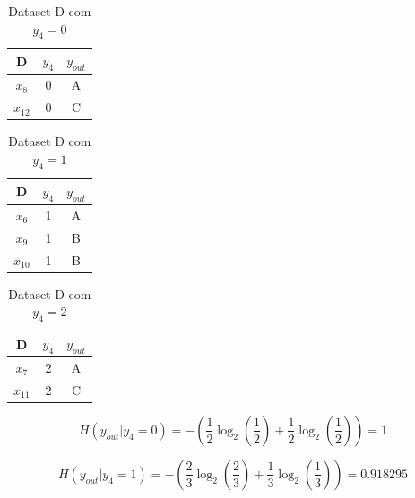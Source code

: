 \documentclass{article}
\begin{document}
\begin{multicols}{3}
\setlength{\columnseprule}{0pt}

\vspace*{\fill}
\begin{table}[H]
\centering
\begin{tabular}{|c|c|c|}
\hline  
D     & $y_4$ & $y_{out}$ \\ \hline
$x_8$ & 0     & A         \\ \hline
$x_{12}$ & 0     & C         \\ \hline
\end{tabular}
\caption{Dataset D com $y_4 = 0$}
\label{tab:datasetDy4=0}
\end{table}

\vspace*{\fill}
\collumnbreak

\begin{table}[H]
\centering
\begin{tabular}{|c|c|c|}
\hline
D     & $y_4$ & $y_{out}$ \\ \hline
$x_6$ & 1     & A         \\ \hline
$x_9$ & 1     & B         \\ \hline
$x_{10}$ & 1     & B         \\ \hline
\end{tabular}
\caption{Dataset D com $y_4 = 1$}
\label{tab:datasetDy4=1}
\end{table}

\vspace*{\fill}
\collumnbreak

\begin{table}[H]
\centering
\begin{tabular}{|c|c|c|}
\hline
D     & $y_4$ & $y_{out}$ \\ \hline
$x_7$ & 2     & A         \\ \hline
$x_{11}$ & 2     & C         \\ \hline
\end{tabular}
\caption{Dataset D com $y_4 = 2$}
\label{tab:datasetDy4=2}
\end{table}

\end{multicols}

\[ H(y_{out}|y_4 = 0) = - \left( \frac{1}{2} \log_2 \left( \frac{1}{2} \right) + \frac{1}{2} \log_2 \left( \frac{1}{2} \right) \right) = 1 \]

\[ H(y_{out}|y_4 = 1) = - \left( \frac{2}{3} \log_2 \left( \frac{2}{3} \right) + \frac{1}{3} \log_2 \left( \frac{1}{3} \right) \right) = 0.918295 \]
\end{document}

